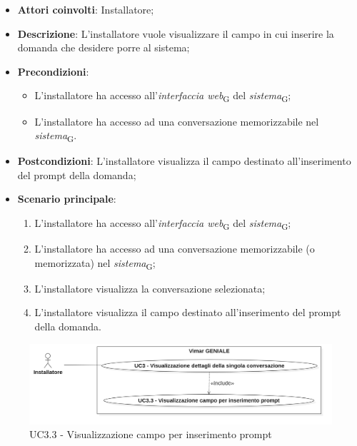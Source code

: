 \begin{itemize}
    \item \textbf{Attori coinvolti}: Installatore;
    \item \textbf{Descrizione}: L'installatore vuole visualizzare il campo in cui inserire la domanda che desidere porre al sistema;
    \item \textbf{Precondizioni}: 
    \begin{itemize}
        \item L’installatore ha accesso all’\textit{interfaccia web}\textsubscript{G} del \textit{sistema}\textsubscript{G};
        \item L’installatore ha accesso ad una conversazione memorizzabile nel \textit{sistema}\textsubscript{G}.
    \end{itemize}
    \item \textbf{Postcondizioni}: L'installatore visualizza il campo destinato all'inserimento del prompt della domanda;
    \item \textbf{Scenario principale}:
    \begin{enumerate}
        \item L’installatore ha accesso all’\textit{interfaccia web}\textsubscript{G} del \textit{sistema}\textsubscript{G};
        \item L’installatore ha accesso ad una conversazione memorizzabile (o memorizzata) nel \textit{sistema}\textsubscript{G};
        \item L'installatore visualizza la conversazione selezionata;
        \item L'installatore visualizza il campo destinato all'inserimento del prompt della domanda.
    \end{enumerate}
\end{itemize}
\begin{figure}[H]
\centering
\includegraphics[width=1\textwidth]{contents/casi_duso/png/UC3.3.png}
\caption{UC3.3 - Visualizzazione campo per inserimento prompt}
\end{figure}

